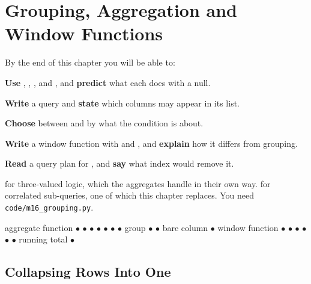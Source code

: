 \chapter{Grouping, Aggregation and Window Functions}\label{ch:grouping}

\begin{outcomes}
By the end of this chapter you will be able to:
\begin{tight}
  \item \textbf{Use} , , ,  and
        , and \textbf{predict} what each does with a null.
  \item \textbf{Write} a  query and \textbf{state} which
        columns may appear in its  list.
  \item \textbf{Choose} between  and  by what the
        condition is about.
  \item \textbf{Write} a window function with  and
        , and \textbf{explain} how it differs from grouping.
  \item \textbf{Read} a query plan for , and \textbf{say}
        what index would remove it.
\end{tight}
\end{outcomes}

\begin{prereq}
 for three-valued logic, which the aggregates handle in their
own way.  for correlated sub-queries, one of which this
chapter replaces. You need \texttt{code/m16\_grouping.py}.
\end{prereq}

\begin{keyterms}
aggregate function $\bullet$  $\bullet$  $\bullet$
 $\bullet$  $\bullet$  $\bullet$
 $\bullet$ group $\bullet$  $\bullet$ bare
column $\bullet$ window function $\bullet$  $\bullet$
 $\bullet$  $\bullet$ 
$\bullet$  $\bullet$ running total $\bullet$
\end{keyterms}

\section{Collapsing Rows Into One}

